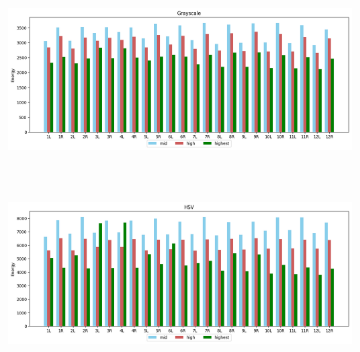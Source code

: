 \begin{figure}[H]
    \caption{Card STFT approach with Blackmanharris window for Grayscale (a) and HSV (b) colourspaces.}
    \centering
    \begin{subfigure}{\textwidth}
        \centering
        \includegraphics[scale=0.5]{images/appendix/stft/card/blackmanharris_Grayscale.png}
        \caption{}
    \end{subfigure}\\
    \begin{subfigure}{\textwidth}
         \centering
          \includegraphics[scale=0.5]{images/appendix/stft/card/blackmanharris_HSV.png}
          \caption{}
    \end{subfigure}
    \fautor
\end{figure}

